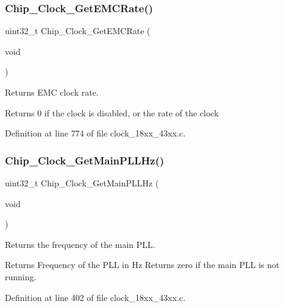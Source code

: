 \subsubsection{\texorpdfstring{Chip\+\_\+\+Clock\+\_\+\+Get\+E\+M\+C\+Rate()}{Chip\_Clock\_GetEMCRate()}}
{\footnotesize\ttfamily uint32\+\_\+t Chip\+\_\+\+Clock\+\_\+\+Get\+E\+M\+C\+Rate (\begin{DoxyParamCaption}\item[{void}]{ }\end{DoxyParamCaption})}



Returns E\+MC clock rate. 

\begin{DoxyReturn}{Returns}
0 if the clock is disabled, or the rate of the clock 
\end{DoxyReturn}


Definition at line 774 of file clock\+\_\+18xx\+\_\+43xx.\+c.

\mbox{\label{group___c_l_o_c_k__18_x_x__43_x_x_gac52f49ae117b1091809cb24f18481b86}} 
\subsubsection{\texorpdfstring{Chip\+\_\+\+Clock\+\_\+\+Get\+Main\+P\+L\+L\+Hz()}{Chip\_Clock\_GetMainPLLHz()}}
{\footnotesize\ttfamily uint32\+\_\+t Chip\+\_\+\+Clock\+\_\+\+Get\+Main\+P\+L\+L\+Hz (\begin{DoxyParamCaption}\item[{void}]{ }\end{DoxyParamCaption})}



Returns the frequency of the main P\+LL. 

\begin{DoxyReturn}{Returns}
Frequency of the P\+LL in Hz Returns zero if the main P\+LL is not running. 
\end{DoxyReturn}


Definition at line 402 of file clock\+\_\+18xx\+\_\+43xx.\+c.

